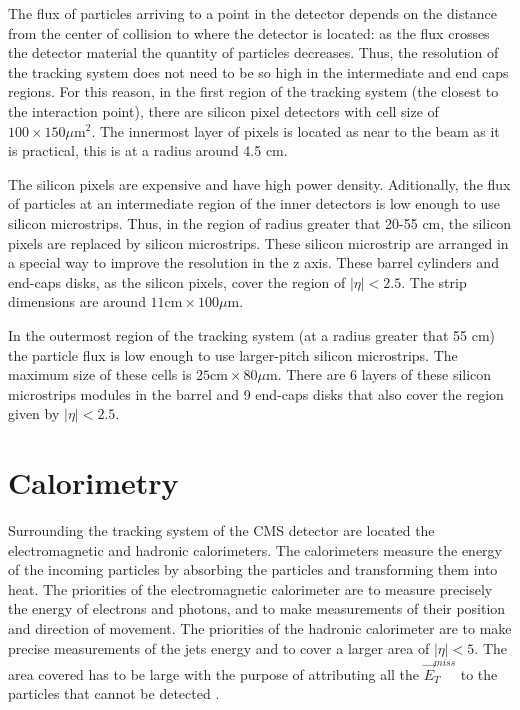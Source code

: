 The flux of particles arriving to a point in the detector depends on the distance from the center of collision to where the detector is located: as the flux crosses the detector material the quantity of particles decreases. Thus, the resolution of the tracking system does not need to be so high in the intermediate and end caps regions. For this reason, in the first region of the tracking system (the closest to the interaction point), there are silicon pixel detectors with cell size of $100 \times 150 \mu \text{m}^2$. The innermost layer of pixels is located as near to the beam as it is practical, this is at a radius around 4.5 cm.
 
The silicon pixels are expensive and have high power density. Aditionally, the flux of particles at an intermediate region of the inner detectors is low enough to use silicon microstrips. Thus, in the region of radius greater that 20-55 cm, the silicon pixels are replaced by silicon microstrips. These silicon microstrip are arranged in a special way to improve the resolution in the z axis. These barrel cylinders and end-caps disks, as the silicon pixels, cover the region of $|\eta| < 2.5$. The strip dimensions are around $11 \text{cm} \times 100 \mu \text{m}$.

In the outermost region of the tracking system (at a radius greater that 55 cm) the particle flux is low enough to use larger-pitch silicon microstrips. The maximum size of these cells is $25\text{cm} \times 80 \mu \text{m}$. There are 6 layers of these silicon microstrips modules in the barrel and 9 end-caps disks that also cover the region given by $|\eta|< 2.5$.


\section{Calorimetry}

Surrounding the tracking system of the CMS detector are located the electromagnetic and hadronic calorimeters. The calorimeters measure the energy of the incoming particles by absorbing the particles and transforming them into heat. The priorities of the electromagnetic calorimeter are to measure precisely the energy of electrons and photons, and to make measurements of their position and direction of movement. The priorities of the hadronic calorimeter are to make precise measurements of the jets energy and to cover a larger area of $|\eta| < 5$. The area covered has to be large with the purpose of attributing all the $\vec{E}_T^{miss}$ to the particles that cannot be detected \cite{Perspectives_LHC}. 

